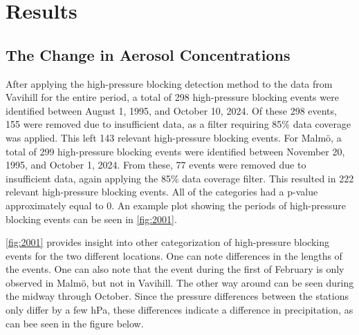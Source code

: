 \newpage
\section{Results}
\subsection{The Change in Aerosol Concentrations}
After applying the high-pressure blocking detection method to the data from Vavihill for the entire period, a total of 298 high-pressure blocking events were identified between August 1, 1995, and October 10, 2024. Of these 298 events, 155 were removed due to insufficient \PM  data, as a filter requiring 85\% data coverage was applied. This left 143 relevant high-pressure blocking events. For Malmö, a total of 299 high-pressure blocking events were identified between November 20, 1995, and October 1, 2024. From these, 77 events were removed due to insufficient \PM  data, again applying the 85\% data coverage filter. This resulted in 222 relevant high-pressure blocking events. All of the categories had a p-value approximately equal to 0. An example plot showing the periods of high-pressure blocking events can be seen in \autoref{fig:2001}.


\autoref{fig:2001} provides insight into other categorization of high-pressure blocking events for the two different locations. One can note differences in the lengths of the events. One can also note that the event during the first of February is only observed in Malmö, but not in Vavihill. The other way around can be seen during the midway through October. Since the pressure differences between the stations only differ by a few hPa, these differences indicate a difference in precipitation, as can bee seen in the figure below. 

